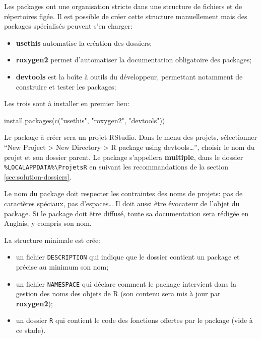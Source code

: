 \documentclass[
  11pt,
  french,
  a4paper,
  extrafontsizes,onecolumn,openright
  ]{memoir}
\newenvironment{Shaded}{\begin{snugshade}}{\end{snugshade}}
\newcommand{\FunctionTok}[1]{\textcolor[rgb]{0.00,0.00,0.00}{#1}}
\newcommand{\NormalTok}[1]{#1}
\newcommand{\StringTok}[1]{\textcolor[rgb]{0.31,0.60,0.02}{#1}}
\providecommand{\tightlist}{%
  \setlength{\itemsep}{0pt}\setlength{\parskip}{0pt}}
\begin{document}
Les packages ont une organisation stricte dans une structure de fichiers et de répertoires figée.
Il est possible de créer cette structure manuellement mais des packages spécialisés peuvent s'en charger:

\begin{itemize}
\tightlist
\item
  \textbf{usethis} automatise la création des dossiers;
\item
  \textbf{roxygen2} permet d'automatiser la documentation obligatoire des packages;
\item
  \textbf{devtools} est la boîte à outils du développeur, permettant notamment de construire et tester les packages;
\end{itemize}

Les trois sont à installer en premier lieu:

\scriptsize

\begin{Shaded}
\begin{Highlighting}[]
\FunctionTok{install.packages}\NormalTok{(}\FunctionTok{c}\NormalTok{(}\StringTok{"usethis"}\NormalTok{, }\StringTok{"roxygen2"}\NormalTok{, }\StringTok{"devtools"}\NormalTok{))}
\end{Highlighting}
\end{Shaded}

\normalsize

Le package à créer sera un projet RStudio.
Dans le menu des projets, sélectionner ``New Project \textgreater{} New Directory \textgreater{} R package using devtools\ldots{}'', choisir le nom du projet et son dossier parent.
Le package s'appellera \textbf{multiple}, dans le dossier \texttt{\%LOCALAPPDATA\%\textbackslash{}ProjetsR} en suivant les recommandations de la section \ref{sec:solution-dossiers}.

Le nom du package doit respecter les contraintes des noms de projets: pas de caractères spéciaux, pas d'espaces\ldots{}
Il doit aussi être évocateur de l'objet du package.
Si le package doit être diffusé, toute sa documentation sera rédigée en Anglais, y compris son nom.

La structure minimale est crée:

\begin{itemize}
\tightlist
\item
  un fichier \texttt{DESCRIPTION} qui indique que le dossier contient un package et précise au minimum son nom;
\item
  un fichier \texttt{NAMESPACE} qui déclare comment le package intervient dans la gestion des noms des objets de R (son contenu sera mis à jour par \textbf{roxygen2});
\item
  un dossier \texttt{R} qui contient le code des fonctions offertes par le package (vide à ce stade).
\end{itemize}
\end{document}
